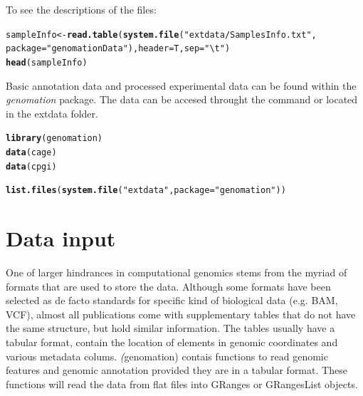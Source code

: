 \documentclass{article}\usepackage[]{graphicx}\usepackage[]{color}
\makeatletter
\newcommand{\hlstr}[1]{\textcolor[rgb]{0.192,0.494,0.8}{#1}}%
\newcommand{\hlstd}[1]{\textcolor[rgb]{0.345,0.345,0.345}{#1}}%
\newcommand{\hlkwb}[1]{\textcolor[rgb]{0.69,0.353,0.396}{#1}}%
\newcommand{\hlkwc}[1]{\textcolor[rgb]{0.333,0.667,0.333}{#1}}%
\newcommand{\hlkwd}[1]{\textcolor[rgb]{0.737,0.353,0.396}{\textbf{#1}}}%
\newenvironment{kframe}{%
 \def\at@end@of@kframe{}%
 \ifinner\ifhmode%
  \def\at@end@of@kframe{\end{minipage}}%
  \begin{minipage}{\columnwidth}%
 \fi\fi%
 \def\FrameCommand##1{\hskip\@totalleftmargin \hskip-\fboxsep
 \colorbox{shadecolor}{##1}\hskip-\fboxsep
     \hskip-\linewidth \hskip-\@totalleftmargin \hskip\columnwidth}%
 \MakeFramed {\advance\hsize-\width
   \@totalleftmargin\z@ \linewidth\hsize
   \@setminipage}}%
 {\par\unskip\endMakeFramed%
 \at@end@of@kframe}
\newenvironment{knitrout}{}{} %
\newcommand{\Rpackage}[1]{{\textit{#1}}}
\makeatother
\begin{document}
To see the descriptions of the files:
\begin{knitrout}
\color{fgcolor}\begin{kframe}
\begin{alltt}
\hlstd{sampleInfo} \hlkwb{<-} \hlkwd{read.table}\hlstd{(}\hlkwd{system.file}\hlstd{(}\hlstr{"extdata/SamplesInfo.txt"}\hlstd{,}
    \hlkwc{package} \hlstd{=} \hlstr{"genomationData"}\hlstd{),} \hlkwc{header} \hlstd{= T,} \hlkwc{sep} \hlstd{=} \hlstr{"\textbackslash{}t"}\hlstd{)}
\hlkwd{head}\hlstd{(sampleInfo)}
\end{alltt}
\end{kframe}
\end{knitrout}


Basic annotation data and processed experimental data can be found within the \Rpackage{genomation} package.
The data can be accesed throught the  command or located in the extdata folder. 
\begin{knitrout}
\color{fgcolor}\begin{kframe}
\begin{alltt}
\hlkwd{library}\hlstd{(genomation)}
\hlkwd{data}\hlstd{(cage)}
\hlkwd{data}\hlstd{(cpgi)}

\hlkwd{list.files}\hlstd{(}\hlkwd{system.file}\hlstd{(}\hlstr{"extdata"}\hlstd{,} \hlkwc{package} \hlstd{=} \hlstr{"genomation"}\hlstd{))}
\end{alltt}
\end{kframe}
\end{knitrout}

\newpage


\section{Data input}

One of larger hindrances in computational genomics stems from the myriad of formats
that are used to store the data. Although some formats have been selected as de facto standards
for specific kind of biological data (e.g. BAM, VCF), 
almost all publications come with supplementary tables that do not have the same structure, 
but hold similar information. The tables usually have a tabular format, contain the location
of elements in genomic coordinates and various metadata colums. 
\Rpackage(genomation) contais functions to read genomic features and genomic annotation 
provided they are in a tabular format. These functions will read the data from 
flat files into GRanges or GRangesList objects.
\end{document}
